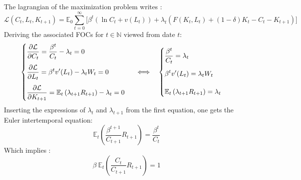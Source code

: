 \documentclass[12pt]{article}
\begin{document}
\subsection{}
The lagrangian of the maximization problem writes :
\begin{equation*}
    \mathcal{L}(C_t,L_t,K_{t+1}) = \mathbb{E}_0\sum_{t=0}^{\infty} \Big[ \beta^t (\ln C_t + v(L_t)) + \lambda_t (F(K_t, L_t) + (1 - \delta)K_t - C_t - K_{t+1}) \Big]
\end{equation*}
Deriving the associated FOCs for $t \in \mathbb{N}$ viewed from date $t$:
\[
\begin{cases}
    \begin{array}{@{}l}
        \displaystyle \frac{\partial \mathcal{L}}{\partial C_t} =  \frac{\beta^t}{C_t} - \lambda_t = 0\\[12pt]
        \displaystyle \frac{\partial \mathcal{L}}{\partial L_t} = \beta^t v'(L_t) - \lambda_t W_t = 0\\[12pt]
        \displaystyle \frac{\partial \mathcal{L}}{\partial K_{t+1}} = \mathbb{E}_t \left( \lambda_{t+1} R_{t+1} \right) - \lambda_t = 0\\
    \end{array}
\end{cases}
\Longleftrightarrow \quad
\begin{cases}
    \begin{array}{@{}l}
        \displaystyle \frac{\beta^t}{C_t} = \lambda_t\\[12pt]
        \displaystyle \beta^t v'(L_t) = \lambda_t W_t\\[12pt]
        \displaystyle \mathbb{E}_t \left( \lambda_{t+1} R_{t+1} \right) = \lambda_t\\
    \end{array}
\end{cases}
\]
Inserting the expressions of $\lambda_t$ and $\lambda_{t+1}$ from the first equation, one gets the Euler intertemporal equation: 
\begin{equation*}
    \mathbb{E}_t \left( \frac{\beta^{t+1}}{C_{t+1}} R_{t+1} \right) = \frac{\beta^t}{C_t}
\end{equation*}
Which implies : 
\begin{equation*}
   \beta~\mathbb{E}_t \left( \frac{C_t}{C_{t+1}} R_{t+1} \right) = 1
\end{equation*}
\end{document}
